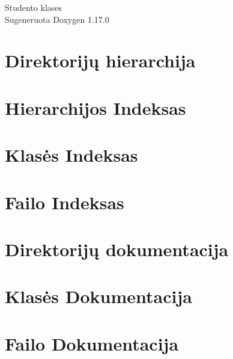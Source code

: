 \documentclass[twoside]{book}
\newcommand{\+}{\discretionary{\mbox{\scriptsize$\hookleftarrow$}}{}{}}
\newcommand{\clearemptydoublepage}{%
    \newpage{\pagestyle{empty}\cleardoublepage}%
  }
\begin{document}
  \raggedbottom
    \hypersetup{pageanchor=false,
                bookmarksnumbered=true,
                pdfencoding=unicode
               }
  \begin{titlepage}
  \vspace*{7cm}
  \begin{center}%
  {\Large Studento klases}\\
  \vspace*{1cm}
  {\large Sugeneruota Doxygen 1.17.0}\\
  \end{center}
  \end{titlepage}
  \clearemptydoublepage
  \tableofcontents
  \clearemptydoublepage
  \hypersetup{pageanchor=true}
\chapter{Direktorijų hierarchija}

\chapter{Hierarchijos Indeksas}

\chapter{Klasės Indeksas}

\chapter{Failo Indeksas}

\chapter{Direktorijų dokumentacija}


\chapter{Klasės Dokumentacija}


\chapter{Failo Dokumentacija}


















  \backmatter
  \newpage
  \clearemptydoublepage
  \printindex
\end{document}
